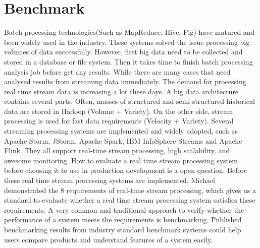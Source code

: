 \section{Benchmark}
Batch processing technologies(Such as MapReduce, Hive, Pig) have matured and been widely used in the industry. These systems solved the issue processing big volumes of data successfully. However, first big data need to be collected and stored in a database or file system. Then it takes time to finish batch processing analysis job before get any results. While there are many cases that need analysed results from streaming data immediately. The demand for processing real time stream data is increasing a lot these days. A big data architecture contains several parts. Often, masses of structured and semi-structured historical data are stored in Hadoop (Volume + Variety). On the other side, stream processing is used for fast data requirements (Velocity + Variety)\cite{GameChanger}. Several streaming processing systems are implemented and widely adopted, such as Apache Storm, JStorm, Apache Spark, IBM InfoSphere Streams and Apache Flink. They all support real-time stream processing, high scalability, and awesome monitoring. How to evaluate a real time stream processing system before choosing it to use in production development is a open question.  Before these real time stream processing systems are implemented, Michael demonstrated the 8 requirements \cite{8requirements} of real-time stream processing, which gives us a standard to evaluate whether a real time stream processing system satisfies these requirements.  A very common and traditional approach to verify whether the performance of a system meets the requirements is benchmarking. Published benchmarking results from industry standard benchmark systems could help users compare products and understand features of a system easily.

